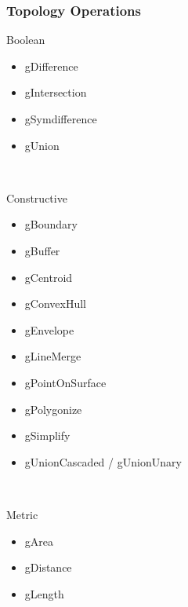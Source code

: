\documentclass[slidestop,mathserif]{beamer}
\begin{document}
\begin{frame}
\frametitle{Topology Operations}

\begin{beamerboxesrounded}{Boolean}
\begin{multicols}{3}
\begin{itemize}
\item gDifference
\item gIntersection
\item gSymdifference
\item gUnion
\end{itemize}
\end{multicols}
\end{beamerboxesrounded}
~\\
\begin{beamerboxesrounded}{Constructive}
\begin{multicols}{3}
\begin{itemize}
\item gBoundary
\item gBuffer
\item gCentroid
\item gConvexHull
\item gEnvelope
\item gLineMerge
\item gPointOnSurface
\item gPolygonize
\item gSimplify
\item gUnionCascaded / gUnionUnary
\end{itemize}
\end{multicols}
\end{beamerboxesrounded}
~\\
\begin{beamerboxesrounded}{Metric}
\begin{multicols}{3}
\begin{itemize}
\item gArea
\item gDistance
\item gLength
\end{itemize}
\end{multicols}
\end{beamerboxesrounded}


\end{frame}

\end{document}
